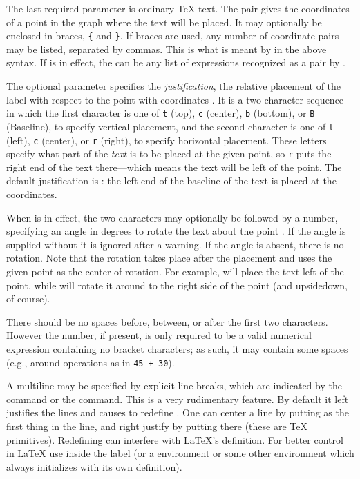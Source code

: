 \documentclass[letterpaper]{article}
\begin{document}
The last required parameter is ordinary \TeX{} text. The pair
 gives the coordinates of a point in the graph
where the text will be placed. It may optionally be enclosed in braces,
\verb${$ and \verb$}$. If braces are used, any number of coordinate
pairs may be listed, separated by commas. This is what is meant by
 in the above syntax. If  is in effect,
the  can be any list of expressions recognized as a pair
by \MP{}.

The optional parameter  specifies the
\emph{justification}, the relative placement of the label with respect
to the point with coordinates . It is a
two-character sequence in which the first character is one of \texttt{t}
(top), \texttt{c} (center), \texttt{b} (bottom), or \texttt{B}
(Baseline), to specify vertical placement, and the second character is
one of \texttt{l} (left), \texttt{c} (center), or \texttt{r} (right), to
specify horizontal placement. These letters specify what part of the
\emph{text} is to be placed at the given point, so \texttt{r} puts the
right end of the text there---which means the text will be left of the
point. The default justification is : the left end of the
baseline of the text is placed at the coordinates.

When  is in effect, the two characters may optionally be
followed by a number, specifying an angle in degrees to rotate the text
about the point . If the angle is supplied
without  it is ignored after a warning. If the angle is
absent, there is no rotation. Note that the rotation takes place after
the placement and uses the given point as the center of rotation. For
example,  will place the text left of the point, while
 will rotate it around to the right side of the point (and
upsidedown, of course).

There should be no spaces before, between, or after the first two
characters. However the number, if present, is only required to be a
valid \MP{} numerical expression containing no bracket characters; as
such, it may contain some spaces (e.g., around operations as in
\texttt{45 + 30}).

A multiline  may be specified by explicit line breaks, which
are indicated by the \bbsl{} command or the  command. This is a
very rudimentary feature. By default it left justifies the lines and
causes  to redefine \bbsl. One can center a line by putting
 as the first thing in the line, and right justify by putting
 there (these are \TeX{} primitives). Redefining \bbsl{} can
interfere with \LaTeX{}'s definition. For better control in \LaTeX{} use
 inside the label (or a  environment or some
other environment which always initializes \bbsl{} with its own
definition).
\end{document}
